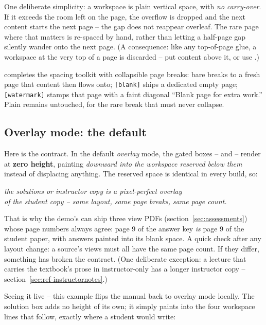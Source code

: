 One deliberate simplicity: a workspace is plain vertical space, with
\emph{no carry-over}. If it exceeds the room left on the page, the overflow
is dropped and the next content starts the next page -- the gap does not
reappear overleaf. The rare page where that matters is re-spaced by hand,
rather than letting a half-page gap silently wander onto the next page. (A
consequence: like any top-of-page glue, a workspace at the very top of a
page is discarded -- put content above it, or use .)

 completes the spacing toolkit with collapsible page breaks:
bare  breaks to a fresh page that content then flows onto;
\texttt{[blank]} ships a dedicated empty page;
\texttt{[watermark]} stamps that page with a faint diagonal ``Blank page for
extra work.'' Plain  remains untouched, for the rare break that
must never collapse.

\subsection{Overlay mode: the default}

Here is the contract. In the default \emph{overlay} mode, the gated boxes --
 and  -- render at \textbf{zero height},
painting \emph{downward into the workspace reserved below them} instead of
displacing anything. The reserved space is identical in every build, so:

\begin{center}
  \emph{the solutions or instructor copy is a pixel-perfect overlay\\
  of the student copy -- same layout, same page breaks, same page count.}
\end{center}

That is why the demo's  can ship three view PDFs
(section~\ref{sec:assessments}) whose page numbers always agree: page 9 of
the answer key \emph{is} page 9 of the student paper, with answers painted
into its blank space. A quick check after any layout change: a source's
views must all have the same page count. If they differ, something has broken the
contract. (One deliberate exception: a lecture that carries the textbook's
prose in instructor-only  has a longer instructor copy --
section~\ref{sec:ref-instructornotes}.)

Seeing it live -- this example flips the manual back to overlay mode
locally. The solution box adds no height of its own; it simply paints into
the four workspace lines that follow, exactly where a student would write:

